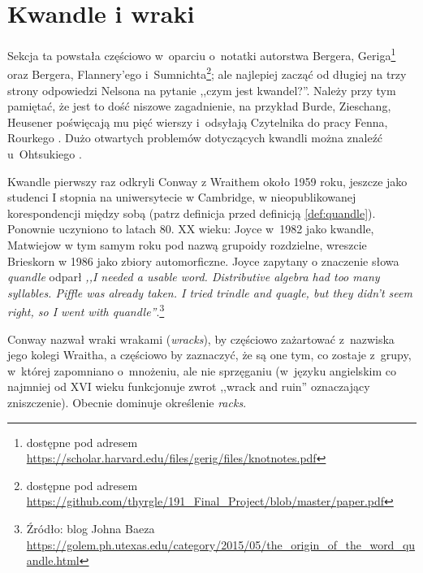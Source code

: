 
\section{Kwandle i wraki}
%

Sekcja ta powstała częściowo w~oparciu o~notatki autorstwa Bergera, Geriga\footnote{dostępne pod adresem \url{https://scholar.harvard.edu/files/gerig/files/knotnotes.pdf}} oraz Bergera, Flannery'ego i~Sumnichta\footnote{dostępne pod adresem \url{https://github.com/thyrgle/191_Final_Project/blob/master/paper.pdf}}; ale najlepiej zacząć od długiej na trzy strony odpowiedzi Nelsona \cite{nelson16} na pytanie ,,czym jest kwandel?''.
%
%
%
%
%
Należy przy tym pamiętać, że jest to dość niszowe zagadnienie, na przykład Burde, Zieschang, Heusener \cite[s. 11]{burde14} poświęcają mu pięć wierszy i~odsyłają Czytelnika do pracy Fenna, Rourkego \cite{rourke92}.
%
%
Dużo otwartych problemów dotyczących kwandli można znaleźć u~Ohtsukiego \cite[s. 455-465]{ohtsuki02}.

Kwandle pierwszy raz odkryli Conway z Wraithem około 1959 roku, jeszcze jako studenci I stopnia na uniwersytecie w Cambridge, w nieopublikowanej korespondencji między sobą (patrz definicja przed definicją \ref{def:quandle}).
%
%
Ponownie uczyniono to latach 80. XX wieku: Joyce w~1982 jako kwandle, Matwiejow w tym samym roku pod nazwą grupoidy rozdzielne, wreszcie Brieskorn w 1986 jako zbiory automorficzne.
%
%
%
%
%
Joyce zapytany o znaczenie słowa \emph{quandle} odparł \emph{,,I needed a usable word. Distributive algebra had too many syllables. Piffle was already taken. I tried trindle and quagle, but they didn’t seem right, so I went with quandle''}.\footnote{Źródło: blog Johna Baeza \url{https://golem.ph.utexas.edu/category/2015/05/the_origin_of_the_word_quandle.html}}
%

Conway nazwał wraki wrakami (\emph{wracks}), by częściowo zażartować z~nazwiska jego kolegi Wraitha, a częściowo by zaznaczyć, że są one tym, co zostaje z~grupy, w~której zapomniano o~mnożeniu, ale nie sprzęganiu (w~języku angielskim co najmniej od XVI wieku funkcjonuje zwrot ,,wrack and ruin'' oznaczający zniszczenie).
%
%
Obecnie dominuje określenie \emph{racks}.

